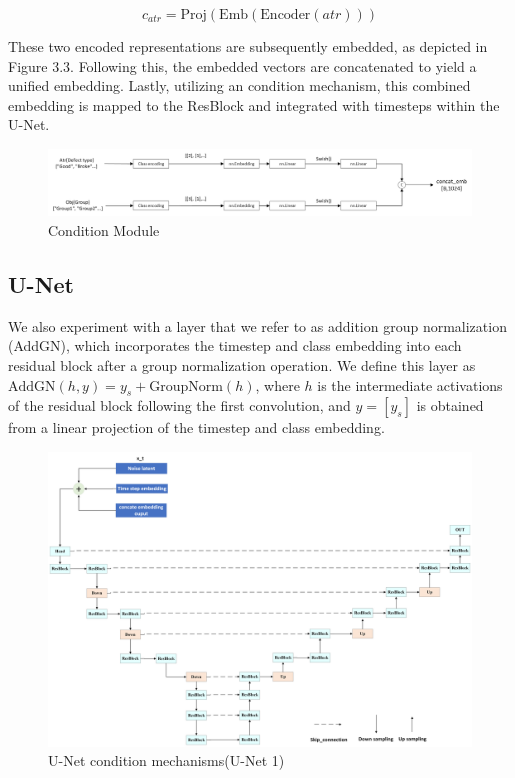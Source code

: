 \begin{equation}
c_{atr} = \text{Proj}(\text{Emb}(\text{Encoder}(atr)))
\end{equation}

These two encoded representations are subsequently embedded, as depicted in Figure 3.3. Following this, the embedded vectors are concatenated to yield a unified embedding. Lastly, utilizing an condition mechanism, this combined embedding is mapped to the ResBlock and integrated with timesteps within the U-Net.

\begin{figure}[h]
    \centering
    \includegraphics[width=1\linewidth]{Condition_Module.png}
    \caption{Condition Module}
    \label{fig:enter-label}
\end{figure}



\subsection{U-Net}
We also experiment with a layer that we refer to as addition group normalization (AddGN), which incorporates the timestep and class embedding into each residual block after a group normalization\cite{group_normalization} operation. We define this layer as $ \text{AddGN}(h, y) = y_s + \text{GroupNorm}(h) $, where $ h $ is the intermediate activations of the residual block following the first convolution, and $ y = [y_s] $ is obtained from a linear projection of the timestep and class embedding.

\begin{figure}
    \centering
    \includegraphics[height=!,width=0.95\linewidth,keepaspectratio=true]{Unet_adaGN.png}
    \caption{U-Net condition mechanisms(U-Net 1)}
    \label{fig:enter-label}
\end{figure}

